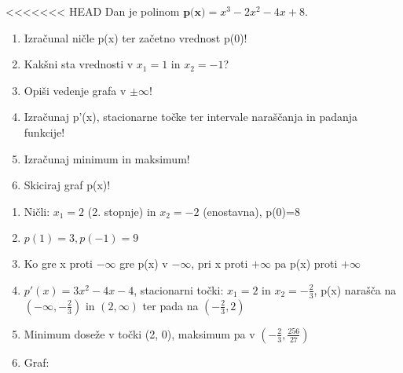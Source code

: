 \begin{vaja}
<<<<<<< HEAD
  Dan je polinom $\textbf{p(x)}= x^3-2x^2-4x+8$.
\begin{enumerate}
\item Izračunal ničle p(x) ter začetno vrednost p(0)!
\item Kakšni sta vrednosti v $x_1=1$ in $x_2=-1$?
\item Opiši vedenje grafa v $\pm \infty$!
\item Izračunaj p'(x), stacionarne točke ter intervale naraščanja in padanja funkcije!
\item Izračunaj minimum in maksimum!
\item Skiciraj graf p(x)!
\end{enumerate}

  \begin{odgovor}
    \begin{enumerate}
\item Ničli: $x_1=2$ (2. stopnje) in $x_2=-2$ (enostavna), p(0)=8
\item $p(1)=3, p(-1)=9$
\item Ko gre x proti $-\infty$ gre p(x) v $-\infty$, pri x proti $+\infty$ pa p(x) proti $+\infty$
\item $p'(x)=3x^2-4x-4$, stacionarni točki: $x_1=2$ in $x_2=-\frac{2}{3}$, p(x) narašča na $(-\infty, -\frac{2}{3})$  in $(2, \infty)$ ter pada na $(-\frac{2}{3}, 2)$
\item Minimum doseže v točki (2, 0), maksimum pa v $(-\frac{2}{3}, \frac{256}{27})$
\item Graf:
\end{enumerate}
  \end{odgovor}
\end{vaja}

